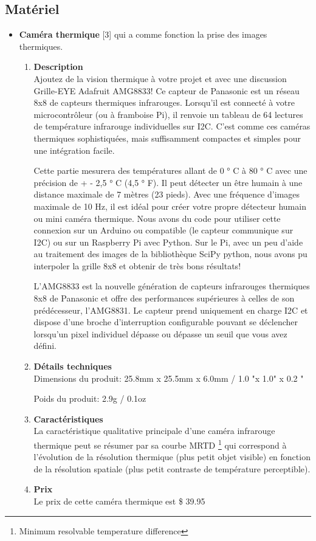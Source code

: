 \documentclass[12pt]{article}
\begin{document}
\subsection{Matériel}
\begin{itemize}
	\item \textbf{Caméra thermique} [3] qui a comme fonction la prise des images thermiques.
	\begin{enumerate}
	\item \textbf{Description}\\
Ajoutez de la vision thermique à votre projet et avec une discussion Grille-EYE Adafruit AMG8833! Ce capteur de Panasonic est un réseau 8x8 de capteurs thermiques infrarouges. Lorsqu'il est connecté à votre microcontrôleur (ou à framboise Pi), il renvoie un tableau de 64 lectures de température infrarouge individuelles sur I2C. C'est comme ces caméras thermiques sophistiquées, mais suffisamment compactes et simples pour une intégration facile.

Cette partie mesurera des températures allant de 0 ° C à 80 ° C avec une précision de + - 2,5 ° C (4,5 ° F). Il peut détecter un être humain à une distance maximale de 7 mètres (23 pieds). Avec une fréquence d'images maximale de 10 Hz, il est idéal pour créer votre propre détecteur humain ou mini caméra thermique. Nous avons du code pour utiliser cette connexion sur un Arduino ou compatible (le capteur communique sur I2C) ou sur un Raspberry Pi avec Python. Sur le Pi, avec un peu d'aide au traitement des images de la bibliothèque SciPy python, nous avons pu interpoler la grille 8x8 et obtenir de très bons résultats!

L'AMG8833 est la nouvelle génération de capteurs infrarouges thermiques 8x8 de Panasonic et offre des performances supérieures à celles de son prédécesseur, l'AMG8831. Le capteur prend uniquement en charge I2C et dispose d'une broche d'interruption configurable pouvant se déclencher lorsqu'un pixel individuel dépasse ou dépasse un seuil que vous avez défini.

	\item \textbf{Détails techniques}\\
	Dimensions du produit: 25.8mm x 25.5mm x 6.0mm / 1.0 "x 1.0" x 0.2 "
	
	Poids du produit: 2.9g / 0.1oz
	\item \textbf{Caractéristiques}\\
	La caractéristique qualitative principale d’une caméra infrarouge thermique peut se résumer par sa courbe MRTD \footnote{Minimum resolvable temperature difference} qui correspond à l’évolution de la résolution thermique (plus petit objet visible) en fonction de la résolution spatiale (plus petit contraste de température perceptible).
	\item \textbf{Prix}\\
	Le prix de cette caméra thermique est  \$ 39.95  
	\newpage
\end{enumerate}	 


\end{itemize}
\end{document}
